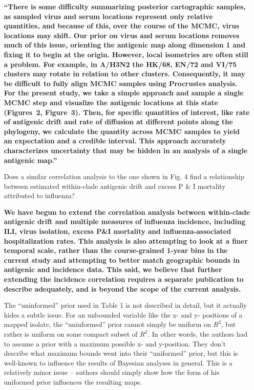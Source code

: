 \documentclass[11pt,oneside,letterpaper]{article}
\begin{document}
\textbf{``There is some difficulty summarizing posterior cartographic samples, as sampled virus and serum locations represent only relative quantities, and because of this, over the course of the MCMC, virus locations may shift.
Our prior on virus and serum locations removes much of this issue, orienting the antigenic map along dimension 1 and fixing it to begin at the origin.
However, local isometries are often still a problem.
For example, in A/H3N2 the HK/68, EN/72 and VI/75 clusters may rotate in relation to other clusters.
Consequently, it may be difficult to fully align MCMC samples using Procrustes analysis.
For the present study, we take a simple approach and sample a single MCMC step and visualize the antigenic locations at this state (Figures~2, Figure~3).
Then, for specific quantities of interest, like rate of antigenic drift and rate of diffusion at different points along the phylogeny, we calculate the quantity across MCMC samples to yield an expectation and a credible interval.
This approach accurately characterizes uncertainty that may be hidden in an analysis of a single antigenic map.''}

Does a similar correlation analysis to the one shown in Fig. 4 find a relationship between estimated within-clade antigenic drift and excess P \& I mortality attributed to influenza?

\textbf{We have begun to extend the correlation analysis between within-clade antigenic drift and multiple measures of influenza incidence, including ILI, virus isolation, excess P\&I mortality and influenza-associated hospitalization rates. This analysis is also attempting to look at a finer temporal scale, rather than the course-grained 1-year bins in the current study and attempting to better match geographic bounds in antigenic and incidence data.  This said, we believe that further extending the incidence correlation requires a separate publication to  describe adequately, and is beyond the scope of the current analysis.}

The ``uninformed'' prior used in Table 1 is not described in detail, but it actually hides a subtle issue. For an unbounded variable like the x- and y- positions of a mapped isolate, the ``uninformed'' prior cannot simply be uniform on $R^2$, but rather is uniform on some compact subset of $R^2$. In other words, the authors had to assume a prior with a maximum possible x- and y-position. They don't describe what maximum bounds went into their ``uniformed'' prior, but this is well-known to influence the results of Bayesian analyses in general. This is a relatively minor issue -- authors should simply show how the form of his uniformed prior influences the resulting maps.
\end{document}
